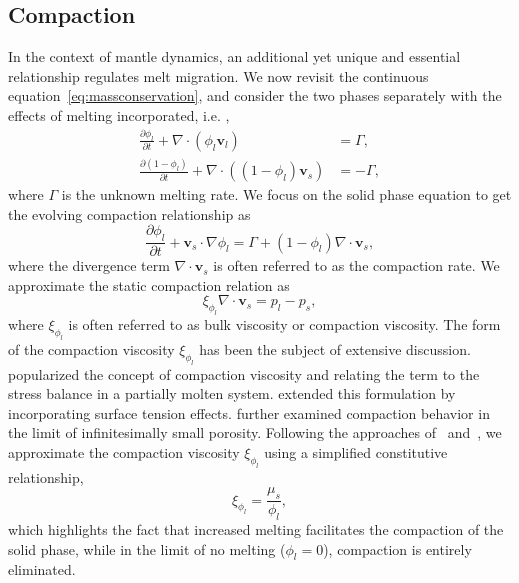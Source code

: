 \subsection{Compaction}
In the context of mantle dynamics, an additional yet unique and essential
relationship regulates melt migration. 
We now revisit the continuous equation~\eqref{eq:massconservation}, and
consider the two phases separately with the effects of melting
incorporated, i.e. ,
\begin{equation}\label{eq:continuousequationPhase}
		  \begin{aligned}
					 \frac{\partial \phi_l }{\partial t} + \nabla \cdot (\phi_l 
					 \mathbf{v}_l) &= \Gamma, \\
					 \frac{\partial (1-\phi_l) }{\partial t} + \nabla \cdot ((1-\phi_l)
					 \mathbf{v}_s) &= -\Gamma,
		  \end{aligned}
\end{equation}
where $\Gamma$ is the unknown melting rate. We focus on the solid phase 
equation to get the evolving compaction relationship as
\begin{equation}\label{eq:solidmelting}
		  \frac{\partial \phi_l}{\partial t} + \mathbf{v}_s \cdot \nabla \phi_l = 
		  \Gamma + (1-\phi_l) \nabla \cdot \mathbf{v}_s,
\end{equation}
where the divergence term $\nabla \cdot \mathbf{v}_s$ is often referred to as the 
compaction rate.
We approximate the static compaction relation as
\begin{equation}\label{eq:compactionviscosity}
		  \xi_{\phi_l}\nabla \cdot \mathbf{v}_s  =p_l - p_s, 
\end{equation}
where $\xi_{\phi_l}$ is often referred to as bulk viscosity or 
compaction viscosity.
The form of the compaction viscosity $\xi_{\phi_l}$ has been the subject of extensive discussion. 
\citet{MagmaPhysics} popularized the concept of
compaction viscosity and relating the term to the stress balance in a partially
molten system.
\citet{TwoPhaseModelCompaction} extended this formulation by incorporating 
surface tension effects. 
\citet{Compactioninamantlewithaverysmallmelt} further examined compaction behavior 
in the limit of infinitesimally small porosity. 
Following the approaches of~\citet{PartialMeltinginUpwellingMantleColumn} 
and~\citet{MagmaDynamicsEnthalpyMethod}, we approximate the compaction
viscosity $\xi_{\phi_l}$ 
using a simplified constitutive relationship,
\begin{equation}\label{eq:bulkviscosity}
		  \xi_{\phi_l} = \frac{\mu_s}{\phi_l},
\end{equation}
which highlights the fact that increased melting facilitates the compaction of the
solid phase, while in the limit of no melting ($\phi_l = 0$), 
compaction is entirely eliminated.

